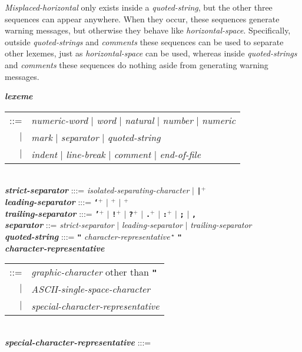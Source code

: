 \documentclass[12pt]{article}
\newcommand{\TT}[1]{{\tt \bfseries #1}}
\newcommand{\STAR}{{\Large $^\star$}}
\newcommand{\PLUS}[1][]{{$^{+#1}$}}
\newcommand{\emkey}[1]{{\em \bfseries #1}}
\newlength{\figurewidth}
\newenvironment{boxedfigure}[1][!btp]%
	{\begin{figure*}[#1]
	 \begin{lrbox}{\figurebox}
	 \begin{minipage}{\figurewidth}

	 \vspace*{1ex}}%
	{
	 \vspace*{1ex}

	 \end{minipage}
	 \end{lrbox}

	 \centering
	 \fbox{\hspace*{0.1in}\usebox{\figurebox}\hspace*{0.1in}}
	 \end{figure*}}
\begin{document}
{\em Misplaced-horizontal} only exists inside a {\em quoted-string},
but the other three sequences can appear anywhere.  When they occur,
these sequences generate warning messages, but otherwise they behave
like {\em horizontal-space}.  Specifically, outside {\em quoted-strings}
and {\em comments} these sequences can be used to separate other lexemes,
just as {\em horizontal-space} can be used,
whereas inside {\em quoted-strings} and
{\em comments} these sequences do nothing aside from generating
warning messages.

\begin{boxedfigure}[!p]

\emkey{lexeme}
        \begin{tabular}[t]{rl}
	::= & {\em numeric-word} $|$ {\em word} $|$
	      {\em natural} $|$ {\em number} $|$ {\em numeric} \\
	$|$ & {\em mark} $|$ {\em separator} $|$ {\em quoted-string} \\
	$|$ & {\em indent} $|$ {\em line-break} $|$
	      {\em comment} $|$ {\em end-of-file}
	\end{tabular}
\label{LEXEME}
\\[1ex]
\emkey{strict-separator} :::= {\em isolated-separating-character} $|$
                              \TT{|}\PLUS{}
\\[0.5ex]
\emkey{leading-separator} :::=
	\TT{`}\PLUS{} $|$
	\TT{\textexclamdown}\PLUS{} $|$ \TT{\textquestiondown}\PLUS{}
\\[0.5ex]
\emkey{trailing-separator} :::= \TT{'}\PLUS{} $|$
				   \TT{!}\PLUS{} $|$
				   \TT{?}\PLUS{} $|$
				   \TT{.}\PLUS{} $|$
				   \TT{:}\PLUS{} $|$
				   \TT{;} $|$
				   \TT{,}
\\[0.5ex]
\emkey{separator}
    ::= {\em strict-separator}
    $|$ {\em leading-separator}
    $|$ {\em trailing-separator}
\\[1ex]
\emkey{quoted-string}\label{QUOTED-STRING} :::=
    \TT{"} {\em character-representative}\,\STAR{} \TT{"}
\\[0.3ex]
\emkey{character-representative}\label{CHARACTER-REPRESENTATIVE}
	\begin{tabular}[t]{@{}rl@{}}
	::= & {\em graphic-character} other than \TT{"} \\
	$|$ & {\em ASCII-single-space-character} \\
	$|$ & {\em special-character-representative} \\
	\end{tabular}
\\[0.3ex]
\emkey{special-character-representative} :::=

\end{boxedfigure}
\end{document}
